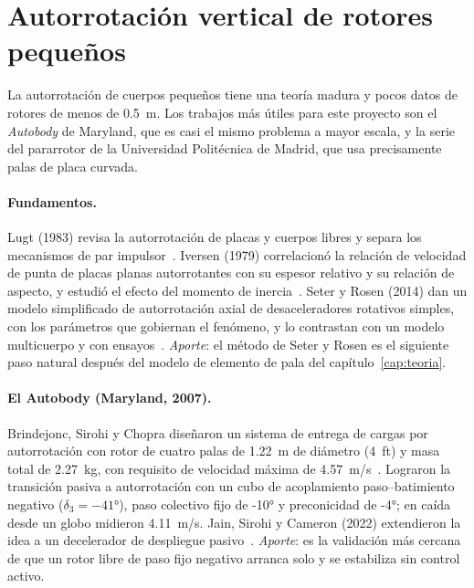 \section{Autorrotación vertical de rotores pequeños}\label{sec:literatura-autorrot}
La autorrotación de cuerpos pequeños tiene una teoría madura y pocos datos de rotores de
menos de \SI{0.5}{m}. Los trabajos más útiles para este proyecto son el \emph{Autobody}
de Maryland, que es casi el mismo problema a mayor escala, y la serie del pararrotor de
la Universidad Politécnica de Madrid, que usa precisamente palas de placa curvada.

\paragraph{Fundamentos.} Lugt (1983) revisa la autorrotación de placas y cuerpos libres y
separa los mecanismos de par impulsor~\cite{literatura-lugt1983}. Iversen (1979) correlacionó
la relación de velocidad de punta de placas planas autorrotantes con su espesor relativo
y su relación de aspecto, y estudió el efecto del momento de
inercia~\cite{literatura-iversen1979}. Seter y Rosen (2014) dan un modelo simplificado
de autorrotación axial de desaceleradores rotativos simples, con los parámetros que
gobiernan el fenómeno, y lo contrastan con un modelo multicuerpo y con
ensayos~\cite{literatura-seter2014}. \emph{Aporte}: el método de Seter y Rosen es el
siguiente paso natural después del modelo de elemento de pala del
capítulo~\ref{cap:teoria}.

\paragraph{El Autobody (Maryland, 2007).} Brindejonc, Sirohi y Chopra diseñaron un
sistema de entrega de cargas por autorrotación con rotor de cuatro palas de
\SI{1.22}{m} de diámetro (\SI{4}{ft}) y masa total de \SI{2.27}{kg}, con requisito de
velocidad máxima de \SI{4.57}{m/s}~\cite{literatura-brindejonc2007}. Lograron la
transición pasiva a autorrotación con un cubo de acoplamiento paso--batimiento negativo
($\delta_3=\ang{-41}$), paso colectivo fijo de \ang{-10} y preconicidad de \ang{-4}; en
caída desde un globo midieron \SI{4.11}{m/s}. Jain, Sirohi y Cameron (2022) extendieron
la idea a un decelerador de despliegue pasivo~\cite{literatura-jain2022}.
\emph{Aporte}: es la validación más cercana de que un rotor libre de paso fijo negativo
arranca solo y se estabiliza sin control activo.

